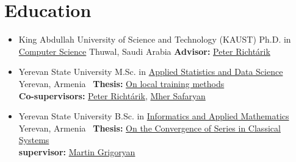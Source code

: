 \documentclass[11pt,a4paper,sans]{moderncv}        %
\newcommand{\peter}{\href{https://richtarik.org/i_bio.html}{Peter Richtárik}}
\newcommand{\grigoryan}{\href{https://scholar.google.com/citations?user=l-2JIPkAAAAJ&hl=en}{Martin Grigoryan}}
\begin{document}
\makecvtitle 



\section{Education}
\vspace{4pt}

\begin{itemize}

\item{
  {King Abdullah University of Science and Technology (KAUST)}
  {Ph.D. in \textcolor{accent}{\href{https://cemse.kaust.edu.sa/cs}{Computer Science}}}
  {Thuwal, Saudi Arabia}{}
  {\textbf{Advisor:} \peter}
} 

\item{
  {Yerevan State University}
  {M.Sc. in \textcolor{accent}{\href{https://math.ysu.am/asds/}{Applied Statistics and Data Science}}}
  {Yerevan, Armenia}{}
  {\faFile \ \textbf{Thesis:} \textcolor{accent}{\href{https://artomaranjyan.github.io/assets/pdf/Master_thesis.pdf}{On local training methods}}\\ 
  \textbf{Co-supervisors:} \peter, \href{https://scholar.google.com/citations?user=dJNwgT8AAAAJ&hl=en}{Mher Safaryan}}
}

\item{
  {Yerevan State University}
  {B.Sc. in \textcolor{accent}{\href{https://www.ysu.am/en/faculty/85}{Informatics and Applied Mathematics}}}
  {Yerevan, Armenia}{}
  {\faFile \ \textbf{Thesis:} \textcolor{accent}{\href{https://artomaranjyan.github.io/assets/pdf/Bachelor_thesis.pdf}{On the Convergence of Series in Classical Systems}}\\ 
  \textbf{supervisor:} \grigoryan}
}

\end{itemize}
\end{document}
